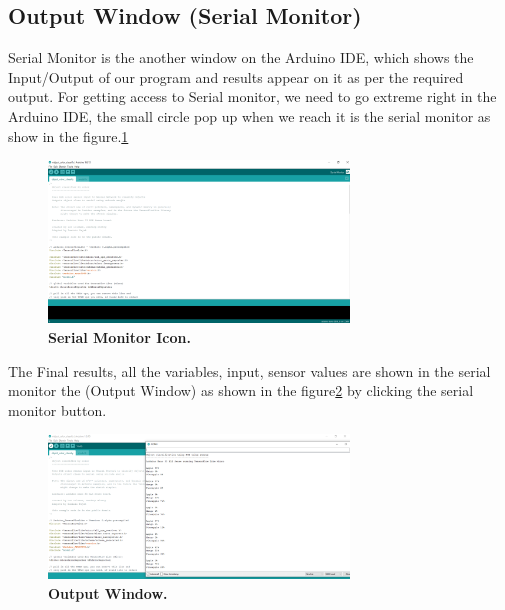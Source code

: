 \subsection{Output Window (Serial Monitor)}
Serial Monitor is the another window on the Arduino IDE, which shows the Input/Output of our program and results appear on it as per the required output. For getting
access to Serial monitor, we need to go extreme right in the Arduino IDE, the small
circle pop up when we reach it is the serial monitor as show in the figure.\ref{fig:Serial Monitor Icon}
\begin{figure}[h]\centering
	\includegraphics[width=8cm]{Images/SoftwareDescription/Serial Monitor Icon}
	\caption{\textbf{Serial Monitor Icon.}}
	\label{fig:Serial Monitor Icon}		
\end{figure} 
The Final results, all the variables, input, sensor values are shown in the serial monitor
the (Output Window) as shown in the figure\ref{fig:Output Window} by clicking the serial monitor button.
\begin{figure}[h]\centering
	\includegraphics[width=8cm]{Images/SoftwareDescription/Output Window}
	\caption{\textbf{Output Window.}}
	\label{fig:Output Window}		
\end{figure} 
